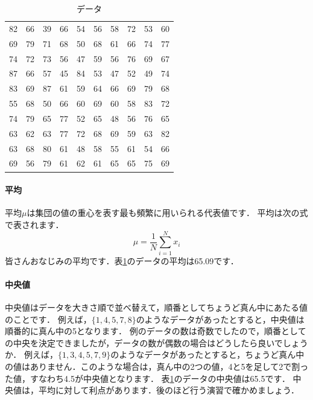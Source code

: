\begin{table}[tb]
    \caption{データ}
    \centering
    \begin{tabular}{cccccccccc}
       82 & 66 & 39 & 66 & 54 & 56 & 58 & 72 & 53 & 60 \\
       69 & 79 & 71 & 68 & 50 & 68 & 61 & 66 & 74 & 77 \\
       74 & 72 & 73 & 56 & 47 & 59 & 56 & 76 & 69 & 67 \\
       87 & 66 & 57 & 45 & 84 & 53 & 47 & 52 & 49 & 74 \\
       83 & 69 & 87 & 61 & 59 & 64 & 66 & 69 & 79 & 68 \\
       55 & 68 & 50 & 66 & 60 & 69 & 60 & 58 & 83 & 72 \\
       74 & 79 & 65 & 77 & 52 & 65 & 48 & 56 & 76 & 65 \\
       63 & 62 & 63 & 77 & 72 & 68 & 69 & 59 & 63 & 82 \\
       63 & 68 & 80 & 61 & 48 & 58 & 55 & 61 & 54 & 66 \\
       69 & 56 & 79 & 61 & 62 & 61 & 65 & 65 & 75 & 69 \\
    \end{tabular}
    \label{tab:sample}
\end{table}

\paragraph{平均}
平均$\mu$は集団の値の重心を表す最も頻繁に用いられる代表値です．
平均は次の式で表されます．
\begin{equation}
    \mu = \frac{1}{N} \sum_{i=1}^{N} x_i
\end{equation}
皆さんおなじみの平均です．表\ref{tab:sample}のデータの平均は65.09です．


\paragraph{中央値}
中央値はデータを大きさ順で並べ替えて，順番としてちょうど真ん中にあたる値のことです．
例えば，$\{1, 4, 5, 7, 8\}$のようなデータがあったとすると，中央値は順番的に真ん中の5となります．
例のデータの数は奇数でしたので，順番としての中央を決定できましたが，データの数が偶数の場合はどうしたら良いでしょうか．
例えば，$\{1,3,4,5,7,9\}$のようなデータがあったとすると，ちょうど真ん中の値はありません．このような場合は，真ん中の2つの値，4と5を足して2で割った値，すなわち4.5が中央値となります．
表\ref{tab:sample}のデータの中央値は65.5です．
中央値は，平均に対して利点があります．後のほど行う演習で確かめましょう．

